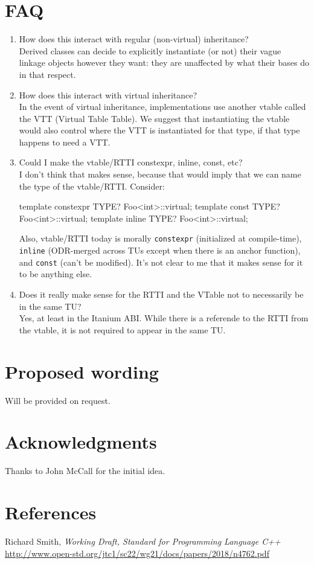 \documentclass{wg21}
\newcommand{\cc}[1]{\texttt{#1}}
\begin{document}
\section{FAQ}
\begin{enumerate}
  \item How does this interact with regular (non-virtual) inheritance?\\
        Derived classes can decide to explicitly instantiate (or not) their
        vague linkage objects however they want: they are unaffected by what
        their bases do in that respect.
  \item How does this interact with virtual inheritance?\\
        In the event of virtual inheritance, implementations use another
        vtable called the VTT (Virtual Table Table). We suggest that
        instantiating the vtable would also control where the VTT is
        instantiated for that type, if that type happens to need a VTT.
  \item Could I make the vtable/RTTI constexpr, inline, const, etc?\\
        I don't think that makes sense, because that would imply that we can
        name the type of the vtable/RTTI. Consider:
        \begin{cpp}
          template constexpr TYPE? Foo<int>::virtual;
          template const TYPE? Foo<int>::virtual;
          template inline TYPE? Foo<int>::virtual;
        \end{cpp}
        Also, vtable/RTTI today is morally \cc{constexpr} (initialized at
        compile-time), \cc{inline} (ODR-merged across TUs except when there
        is an anchor function), and \cc{const} (can't be modified). It's not
        clear to me that it makes sense for it to be anything else.

  \item Does it really make sense for the RTTI and the VTable not to necessarily
        be in the same TU?\\
        Yes, at least in the Itanium ABI. While there is a referende to the
        RTTI from the vtable, it is not required to appear in the same TU.
\end{enumerate}

\section{Proposed wording}
Will be provided on request.

\section{Acknowledgments}
Thanks to John McCall for the initial idea.

\section{References}
\renewcommand{\section}[2]{}%
\begin{thebibliography}{9}

  Richard Smith,
  \emph{Working Draft, Standard for Programming Language C++}\newline
  \url{http://www.open-std.org/jtc1/sc22/wg21/docs/papers/2018/n4762.pdf}

\end{thebibliography}
\end{document}
